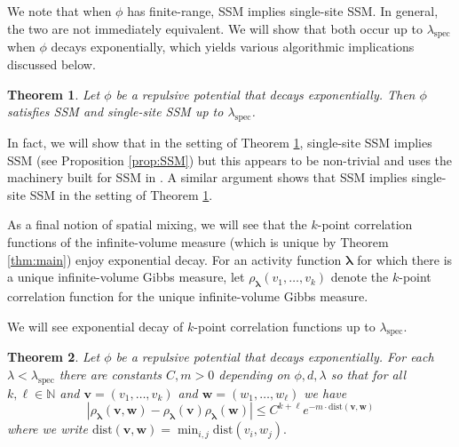 \documentclass[10pt]{amsart}
\newtheorem{theorem}{Theorem}[section]
\theoremstyle{definition}
\theoremstyle{remark}
\newcommand{\spec}{{\mathrm{spec}}}
\newcommand{\blambda}{{\boldsymbol{\lambda}}}
\newcommand{\dist}{\mathrm{dist}}
\begin{document}
	We note that when $\phi$ has finite-range, SSM implies single-site SSM.  In general, the two are not immediately equivalent.  
	We will show that both occur up to $\lambda_\spec$ when $\phi$ decays exponentially, which yields various algorithmic implications discussed below.
	
	\begin{theorem}\label{thm:spatial-mixing}
		Let $\phi$ be a repulsive potential that decays exponentially.  Then $\phi$ satisfies SSM and single-site SSM up to $\lambda_\spec$.
	\end{theorem}
	
	In fact, we will show that in the setting of Theorem \ref{thm:spatial-mixing}, single-site SSM implies SSM (see Proposition \ref{prop:SSM}) but this appears to be non-trivial and uses the machinery built for SSM in \cite{michelen2022strong}.  A similar argument shows that SSM implies single-site SSM in the setting of Theorem \ref{thm:spatial-mixing}. 
	
	
	
	
	
	
	As a final notion of spatial mixing, we will see that the $k$-point correlation functions of the infinite-volume measure (which is unique by Theorem \ref{thm:main}) enjoy exponential decay.  For an activity function $\blambda$ for which there is a unique infinite-volume Gibbs measure, let $\rho_{\blambda}(v_1,\ldots,v_k)$ denote the $k$-point correlation function for the unique infinite-volume Gibbs measure.  
	
	We will see exponential decay of $k$-point correlation functions up to $\lambda_{\spec}$.
	
	\begin{theorem}\label{thm:decay-of-k-point-correlations}
		Let $\phi$ be a repulsive potential that decays exponentially.  For each $\lambda < \lambda_{\spec}$ there are constants $C,m > 0$ depending on $\phi,d,\lambda$ so that for all $k,\ell \in \mathbb{N}$ and $\mathbf{v} = (v_1,\ldots,v_k)$ and $\mathbf{w} = (w_1,\ldots,w_\ell)$ we have $$\left|\rho_{\blambda}(\mathbf{v},\mathbf{w}) - \rho_{\blambda}(\mathbf{v})\rho_{\blambda}(\mathbf{w}) \right| \leq C^{k + \ell} e^{-m \cdot\dist(\mathbf{v},\mathbf{w})}$$
		where we write $\dist(\mathbf{v},\mathbf{w}) = \min_{i,j} \dist(v_i,w_j).$
	\end{theorem}
	
	
\end{document}

